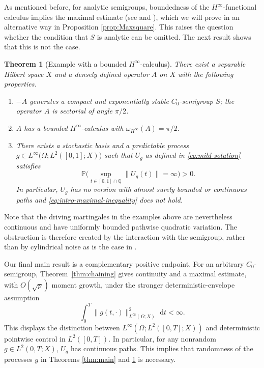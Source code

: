 \documentclass[11pt]{amsart}
\newtheorem{theorem}{Theorem}[section]
\theoremstyle{definition}
\theoremstyle{remark}
\numberwithin{equation}{section}
\renewcommand{\P}{\mathbb P}
\newcommand{\Q}{\mathbb Q}
\newcommand{\1}{\mathbf 1}
\newcommand{\norm}[1]{\lVert #1\rVert}
\newcommand{\dd}{\,\mathrm d}
\begin{document}
As mentioned before, for analytic semigroups, boundedness of the $H^\infty$-functional calculus implies the maximal estimate  (see \cite{Sei10} and \cite{VeraarWeis2011}), which we will prove in an alternative way in Proposition \ref{prop:Maxsquare}. 
This raises the question whether the condition that $S$ is analytic can be omitted.
The next result shows that this is not the case.

\begin{theorem}[Example with a bounded $H^\infty$-calculus]
\label{thm:main2}
There exist a separable Hilbert space \(X\) and a
densely defined operator \(A\) on \(X\) with the following properties.
\begin{enumerate}[label=\textup{(\roman*)}]
\item\label{it1:main2} \(-A\) generates a compact and exponentially stable $C_0$-semigroup
\(S\); the operator \(A\) is sectorial of angle $\pi/2$.
\item\label{it2:main2} $A$ has a bounded $H^\infty$-calculus with $\omega_{H^\infty}(A) = \pi/2$. 
\item\label{it3:main2} There exists a stochastic basis and a predictable process $g\in L^\infty\bigl(\Omega;L^2([0,1];X)\bigr)$
such that $U_g$ as defined in \eqref{eq:mild-solution}
satisfies
\begin{equation*}
 \P\Big(
  \sup_{t\in[0,1]\cap\Q}\norm{U_g(t)}=\infty
 \Big)>0.
\end{equation*}
In particular, \(U_g\) has no version with almost surely bounded or continuous paths and \eqref{eq:intro-maximal-inequality} does not hold.
\end{enumerate}
\end{theorem}

Note that the driving martingales in the examples above are nevertheless continuous and have
uniformly bounded pathwise quadratic variation.  The obstruction is
therefore created by the interaction with the semigroup, rather than by
cylindrical noise as is the case in \cite{IscoeEtAl1990}.

Our final main result is a complementary positive endpoint.  For
an arbitrary \(C_0\)-semigroup, Theorem~\ref{thm:chaining} gives continuity
and a maximal estimate, with \(O(\sqrt p)\) moment growth, under the stronger
deterministic-envelope assumption
\[
 \int_0^T\norm{g(t,\cdot)}_{L^\infty(\Omega;X)}^2\,\dd t<\infty.
\]
This displays the distinction between
\(L^\infty(\Omega;L^2([0,T];X))\) and deterministic pointwise control in
\(L^2([0,T])\). In particular, for any nonrandom $g\in L^2(0,T;X)$, $U_g$ has continuous paths. This implies that randomness of the processes $g$ in Theorems \ref{thm:main} and \ref{thm:main2} is necessary. 
\end{document}
